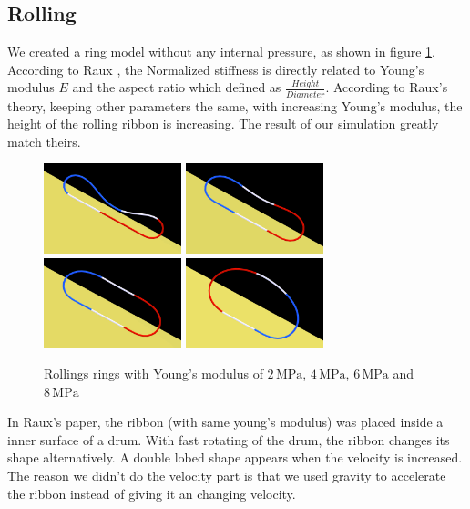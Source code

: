 \documentclass[letterpaper,9pt,twocolumn]{extarticle}
\begin{document}
	\subsection{Rolling}
		We created a ring model without any internal pressure, as shown in figure \ref{rr}. According to Raux \cite{Raux10}, the Normalized stiffness is directly related to Young's modulus $E$ and the aspect ratio which defined as $\frac{Height}{Diameter}$. According to Raux's theory, keeping other parameters the same, with increasing Young's modulus, the height of the rolling ribbon is increasing. The result of our simulation greatly match theirs. 
		
		\begin{figure}[ht]
			\centering
			\includegraphics[width=4cm]{res/roll-2e6.png}
			\includegraphics[width=4cm]{res/roll-3e6.png}\\
			\includegraphics[width=4cm]{res/roll-4e6.png}
			\includegraphics[width=4cm]{res/roll-8e6.png}
			\caption{Rollings rings with Young's modulus of $2\,\mathrm{MPa}$, $4\,\mathrm{MPa}$, $6\,\mathrm{MPa}$ and $8\,\mathrm{MPa}$}
			\label{rr}
		\end{figure}
		In Raux's paper, the ribbon (with same young’s modulus) was placed inside a inner surface of a drum. With fast rotating of the drum, the ribbon changes its shape alternatively. A double lobed shape appears when the velocity is increased. The reason we didn't do the velocity part is that we used gravity to accelerate the ribbon instead of giving it an changing velocity.
\end{document}
